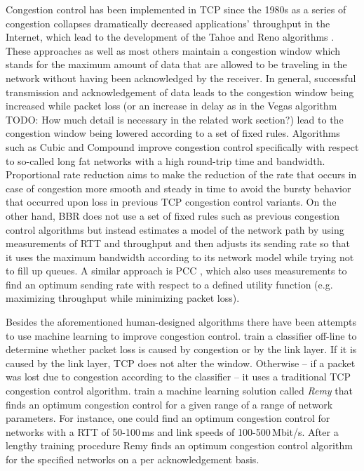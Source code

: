 \documentclass[sigconf]{acmart}
\newcommand\note[2]{{\color{#1}#2}}
\newcommand\todo[1]{{\note{red}{TODO: #1}}}
\begin{document}
Congestion control has been implemented in TCP since the 1980s as a series of congestion collapses dramatically decreased applications' throughput in the Internet, which lead to the development of the Tahoe and Reno algorithms \cite{jacobson_congestion_1988}. These approaches as well as most others maintain a congestion window which stands for the maximum amount of data that are allowed to be traveling in the network without having been acknowledged by the receiver. In general, successful transmission and acknowledgement of data leads to the congestion window being increased while packet loss (or an increase in delay as in the Vegas algorithm \cite{brakmo_tcp_1995} \todo{How much detail is necessary in the related work section?}) lead to the congestion window being lowered according to a set of fixed rules. Algorithms such as Cubic and Compound \cite{ha_cubic:_2008, tan_compound_2006} improve congestion control specifically with respect to so-called long fat networks with a high round-trip time and bandwidth. Proportional rate reduction \cite{dukkipati_proportional_2011} aims to make the reduction of the rate that occurs in case of congestion more smooth and steady in time to avoid the bursty behavior that occurred upon loss in previous TCP congestion control variants. On the other hand, BBR \cite{cardwell_bbr:_2016} does not use a set of fixed rules such as previous congestion control algorithms but instead estimates a model of the network path by using measurements of RTT and throughput and then adjusts its sending rate so that it uses the maximum bandwidth according to its network model while trying not to fill up queues. A similar approach is PCC \cite{dong_pcc:_2015}, which also uses measurements to find an optimum sending rate with respect to a defined utility function (e.g. maximizing throughput while minimizing packet loss). 

Besides the aforementioned human-designed algorithms there have been attempts to use machine learning to improve congestion control. \citet{geurts_machine_2004} train a classifier off-line to determine whether packet loss is caused by congestion or by the link layer. If it is caused by the link layer, TCP does not alter the window. Otherwise -- if a packet was lost due to congestion according to the classifier -- it uses a traditional TCP congestion control algorithm. \citet{winstein_tcp_2013} train a machine learning solution called \textit{Remy} that finds an optimum congestion control for a given range of a range of network parameters. For instance, one could find an optimum congestion control for networks with a RTT of 50-100\,ms and link speeds of 100-500\,Mbit/s. After a lengthy training procedure Remy finds an optimum congestion control algorithm for the specified networks on a per acknowledgement basis. 
\end{document}
